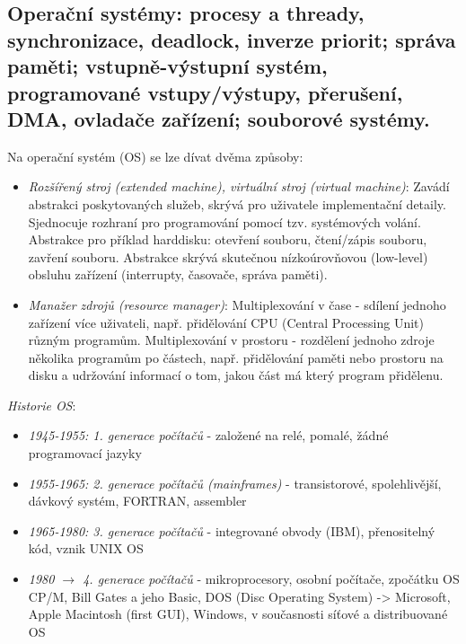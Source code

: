 \subsection{Operační systémy: procesy a thready, synchronizace, deadlock, inverze priorit; správa paměti; vstupně-výstupní systém, programované vstupy/výstupy, přerušení, DMA, ovladače zařízení; souborové systémy.}
Na operační systém (OS) se lze dívat dvěma způsoby:
\begin{itemize}
\item \textit{Rozšířený stroj (extended machine), virtuální stroj (virtual machine)}: Zavádí abstrakci poskytovaných služeb, skrývá pro uživatele implementační detaily. Sjednocuje rozhraní pro programování pomocí tzv. systémových volání. Abstrakce pro příklad harddisku: otevření souboru, čtení/zápis souboru, zavření souboru. Abstrakce skrývá skutečnou nízkoúrovňovou (low-level) obsluhu zařízení (interrupty, časovače, správa paměti).
\item \textit{Manažer zdrojů (resource manager)}: Multiplexování v čase - sdílení jednoho zařízení více uživateli, např. přidělování CPU (Central Processing Unit) různým programům. Multiplexování v prostoru - rozdělení jednoho zdroje několika programům po částech, např. přidělování paměti nebo prostoru na disku a udržování informací o tom, jakou část má který program přidělenu.
\end{itemize}
\textit{Historie OS}:
\begin{itemize}
\item \textit{1945-1955: 1. generace počítačů} - založené na relé, pomalé, žádné programovací jazyky
\item \textit{1955-1965: 2. generace počítačů (mainframes)} - transistorové, spolehlivější, dávkový systém, FORTRAN, assembler
\item \textit{1965-1980: 3. generace počítačů} - integrované obvody (IBM), přenositelný kód, vznik UNIX OS
\item \textit{1980 $ \to $ 4. generace počítačů} - mikroprocesory, osobní počítače, zpočátku OS CP/M, Bill Gates a jeho Basic, DOS (Disc Operating System) -> Microsoft, Apple Macintosh (first GUI), Windows, v současnosti síťové a distribuované OS
\end{itemize}

